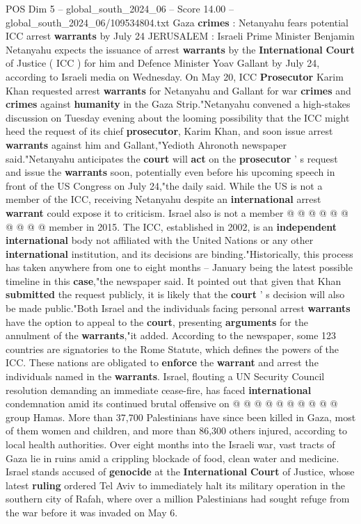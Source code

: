 \begin{textsample}{POS Dim 5 – global\_south\_2024\_06 – Score 14.00 – global\_south\_2024\_06/109534804.txt}  \label{ex:f5_pos_226}
Gaza \textbf{crimes} : Netanyahu fears potential ICC arrest \textbf{warrants} by July 24 JERUSALEM : Israeli Prime Minister Benjamin Netanyahu expects the issuance of arrest \textbf{warrants} by the \textbf{International} \textbf{Court} of Justice ( ICC ) for him and Defence Minister Yoav Gallant by July 24, according to Israeli media on Wednesday.
On May 20, ICC \textbf{Prosecutor} Karim Khan requested arrest \textbf{warrants} for Netanyahu and Gallant for war \textbf{crimes} and \textbf{crimes} against \textbf{humanity} in the Gaza Strip."Netanyahu convened a high-stakes discussion on Tuesday evening about the looming possibility that the ICC might heed the request of its chief \textbf{prosecutor}, Karim Khan, and soon issue arrest \textbf{warrants} against him and Gallant,"Yedioth Ahronoth newspaper said."Netanyahu anticipates the \textbf{court} will \textbf{act} on the \textbf{prosecutor} ' s request and issue the \textbf{warrants} soon, potentially even before his upcoming speech in front of the US Congress on July 24,"the daily said.
While the US is not a member of the ICC, receiving Netanyahu despite an \textbf{international} arrest \textbf{warrant} could expose it to criticism.
Israel also is not a member @ @ @ @ @ @ @ @ @ @ member in 2015.
The ICC, established in 2002, is an \textbf{independent} \textbf{international} body not affiliated with the United Nations or any other \textbf{international} institution, and its decisions are binding."Historically, this process has taken anywhere from one to eight months -- January being the latest possible timeline in this \textbf{case},"the newspaper said.
It pointed out that given that Khan \textbf{submitted} the request publicly, it is likely that the \textbf{court} ' s decision will also be made public."Both Israel and the individuals facing personal arrest \textbf{warrants} have the option to appeal to the \textbf{court}, presenting \textbf{arguments} for the annulment of the \textbf{warrants},"it added.
According to the newspaper, some 123 countries are signatories to the Rome Statute, which defines the powers of the ICC.
These nations are obligated to \textbf{enforce} the \textbf{warrant} and arrest the individuals named in the \textbf{warrants}.
Israel, flouting a UN Security Council resolution demanding an immediate cease-fire, has faced \textbf{international} condemnation amid its continued brutal offensive on @ @ @ @ @ @ @ @ @ @ group Hamas.
More than 37,700 Palestinians have since been killed in Gaza, most of them women and children, and more than 86,300 others injured, according to local health authorities.
Over eight months into the Israeli war, vast tracts of Gaza lie in ruins amid a crippling blockade of food, clean water and medicine.
Israel stands accused of \textbf{genocide} at the \textbf{International} \textbf{Court} of Justice, whose latest \textbf{ruling} ordered Tel Aviv to immediately halt its military operation in the southern city of Rafah, where over a million Palestinians had sought refuge from the war before it was invaded on May 6.

\end{textsample}
